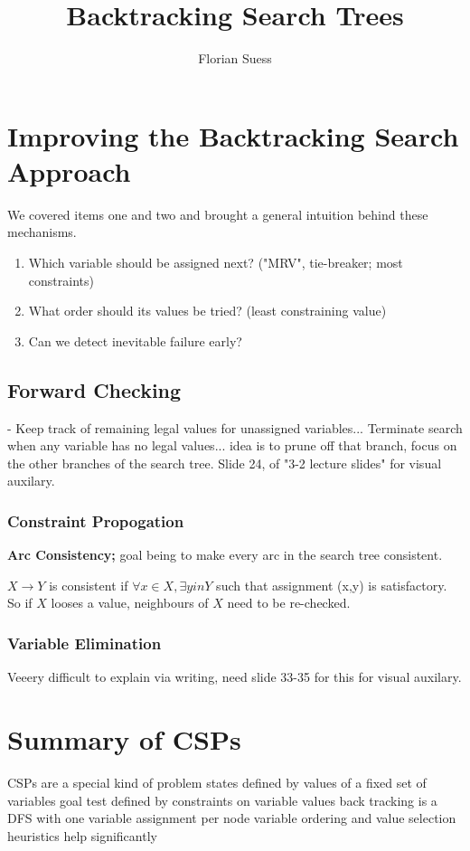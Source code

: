 \documentclass{article}
\begin{document}
\title{Backtracking Search Trees}
\date{}
\author{Florian Suess}
\maketitle

\section{Improving the Backtracking Search Approach}
We covered items one and two and brought a general intuition behind these mechanisms.

\begin{enumerate}
	\item Which variable should be assigned next? ("MRV", tie-breaker; most constraints)
	\item What order should its values be tried? (least constraining value)
	\item Can we detect inevitable failure early?
\end{enumerate}

\subsection{Forward Checking}
- Keep track of remaining legal values for unassigned variables... Terminate search when any variable has no legal values... idea is to prune off that branch, focus on the other branches of the search tree. Slide 24, of "3-2 lecture slides" for visual auxilary.

\subsubsection{Constraint Propogation}
\textbf{Arc Consistency;} goal being to make every arc in the search tree consistent.

$X \rightarrow Y$ is consistent if $\forall x \in X, \exists y in Y$ such that assignment (x,y) is satisfactory. So if $X$ looses a value, neighbours of $X$ need to be re-checked.

\subsubsection{Variable Elimination}
Veeery difficult to explain via writing, need slide 33-35 for this for visual auxilary.

\section{Summary of CSPs}
\begin{outline}
	\1 CSPs are a special kind of problem
		\2 states defined by values of a fixed set of variables
		\2 goal test defined by constraints on variable values
	\1 back tracking is a DFS with one variable assignment per node
	\1 variable ordering and value selection heuristics help significantly
\end{outline}
\end{document}

